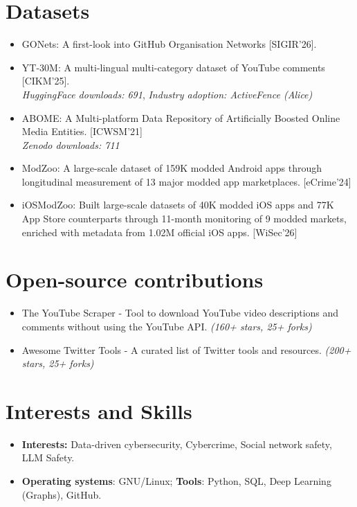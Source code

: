 \documentclass[margin, centered]{res}
\begin{document}
\begin{resume}
\section{Datasets}
\begin{itemize}[leftmargin=*]
\item GONets:  A first-look into GitHub Organisation Networks [SIGIR'26].
\item YT-30M: A multi-lingual multi-category dataset of YouTube comments [CIKM'25].\\
\textit{\small{HuggingFace downloads: 691}},
\textit{\small{Industry adoption: ActiveFence (Alice)}}
\item ABOME: A Multi-platform Data Repository of Artificially Boosted Online Media Entities. [ICWSM'21]\\
\textit{\small{Zenodo downloads: 711}}
\item ModZoo: A large-scale dataset of 159K modded Android apps through longitudinal measurement of 13 major modded app marketplaces. [eCrime'24]
\item iOSModZoo: Built large-scale datasets of 40K modded iOS apps and 77K App Store counterparts through 11-month monitoring of 9 modded markets, enriched with metadata from 1.02M official iOS apps. [WiSec'26]
\end{itemize}
\section{Open-source contributions}
\begin{itemize}[leftmargin=*]
\item The YouTube Scraper - Tool to download YouTube video descriptions and comments without using the YouTube API. \textit{(160+ stars, 25+ forks)}
\item Awesome Twitter Tools - A curated list of Twitter tools  and resources. \textit{(200+ stars, 25+ forks)}

\end{itemize}
\section{Interests and Skills}
\begin{itemize}[leftmargin=*]
 \item[] \textbf{Interests:} Data-driven cybersecurity, Cybercrime,  Social network safety, LLM Safety.
 \item[] \textbf{Operating systems}: GNU/Linux; \textbf{Tools}: Python, SQL, Deep Learning (Graphs), GitHub.
\end{itemize}


\end{resume}
\end{document}
